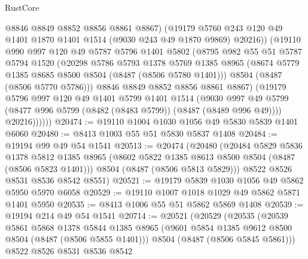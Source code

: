 \begin{lexlean}{RustCore}
\begin{coremodule}
                @8846
                @8849
                @8852
                @8856
                @8861
                @8867)
              (@19179
                @5760
                @243
                @120
                @49
                @1401
                @1870
                @1401
                @1514
                (@9030 @243 @49 @1870 @9869)
                @20216))
            (@19110
              @990
              @997
              @120
              @49
              @5787
              @5796
              @1401
              @5802
              (@8795
                @982
                @55
                @51
                @5787
                @5794
                @1520
                (@20298
                  @5786
                  @5793
                  @1378
                  @5769
                  @1385
                  @8965
                  (@8674 @5779 @1385 @8685 @8500 @8504 (@8487 (@8506 @5780 @1401)))
                  @8504
                  (@8487 (@8506 @5770 @5786)))
                @8846
                @8849
                @8852
                @8856
                @8861
                @8867)
              (@19179
                @5796
                @997
                @120
                @49
                @1401
                @5799
                @1401
                @1514
                (@9030
                  @997
                  @49
                  @5799
                  (@8477 @996 @5799 (@8482 (@8483 @5799)) (@8487 (@8489 @996 @49))))
                @20216))))))
@20474 := @19110 @1004 @1030 @1056 @49 @5830 @5839 @1401 @6060
@20480 := @8413 @1003 @55 @51 @5830 @5837 @1408
@20484 := @19194 @99 @49 @54 @1541
@20513 := @20474
    (@20480
      (@20484
        @5829
        @5836
        @1378
        @5812
        @1385
        @8965
        (@8602 @5822 @1385 @8613 @8500 @8504 (@8487 (@8506 @5823 @1401)))
        @8504
        (@8487 (@8506 @5813 @5829)))
      @8522
      @8526
      @8531
      @8536
      @8542
      @8551)
@20521 := @19179 @5839 @1030 @1056 @49 @5862 @5950 @5970 @6058
@20529 := @19110 @1007 @1018 @1029 @49 @5862 @5871 @1401 @5950
@20535 := @8413 @1006 @55 @51 @5862 @5869 @1408
@20539 := @19194 @214 @49 @54 @1541
@20714 := @20521
    (@20529
      (@20535
        (@20539
          @5861
          @5868
          @1378
          @5844
          @1385
          @8965
          (@9601 @5854 @1385 @9612 @8500 @8504 (@8487 (@8506 @5855 @1401)))
          @8504
          (@8487 (@8506 @5845 @5861)))
        @8522
        @8526
        @8531
        @8536
        @8542

\end{coremodule}
\end{lexlean}
